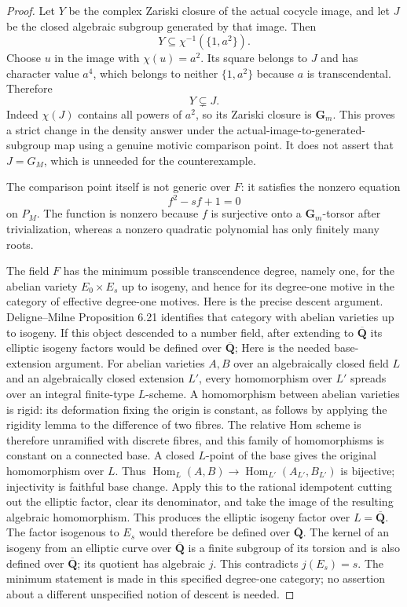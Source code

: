 \begin{proof}
Let \(Y\) be the complex Zariski closure of the actual cocycle image,
and let \(J\) be the closed algebraic subgroup generated by that image.
Then
\[
Y\subseteq\chi^{-1}(\{1,a^2\}).
\]
Choose \(u\) in the image with \(\chi(u)=a^2\). Its square belongs to
\(J\) and has character value \(a^4\), which belongs to neither
\(\{1,a^2\}\) because \(a\) is transcendental. Therefore
\[
Y\subsetneq J.
\tag{A.5.4.2}
\]
Indeed \(\chi(J)\) contains all powers of \(a^2\), so its Zariski
closure is \(\mathbf G_m\). This proves a strict change in the density
answer under the actual-image-to-generated-subgroup map using a genuine
motivic comparison point. It does not assert that \(J=G_M\), which is
unneeded for the counterexample.

The comparison point itself is not generic over \(F\): it satisfies the
nonzero equation
\[
f^2-sf+1=0
\]
on \(P_M\). The function is nonzero because \(f\) is surjective onto a
\(\mathbf G_m\)-torsor after trivialization, whereas a nonzero quadratic
polynomial has only finitely many roots.

The field \(F\) has the minimum possible transcendence degree, namely
one, for the abelian variety \(E_0\times E_s\) up to isogeny, and hence
for its degree-one motive in the category of effective degree-one
motives. Here is the precise descent argument. Deligne--Milne
Proposition 6.21 identifies that category with abelian varieties up to
isogeny. If this object descended to a number field, after extending to
\(\overline{\mathbf Q}\) its elliptic isogeny factors would be defined
over \(\overline{\mathbf Q}\); Here is the needed base-extension argument. For abelian varieties \(A,B\) over an algebraically closed field \(L\) and an algebraically closed extension \(L'\), every homomorphism over \(L'\) spreads over an integral finite-type \(L\)-scheme. A homomorphism between abelian varieties is rigid: its deformation fixing the origin is constant, as follows by applying the rigidity lemma to the difference of two fibres. The relative Hom scheme is therefore unramified with discrete fibres, and this family of homomorphisms is constant on a connected base. A closed \(L\)-point of the base gives the original homomorphism over \(L\). Thus \(\operatorname{Hom}_L(A,B)\to\operatorname{Hom}_{L'}(A_{L'},B_{L'})\) is bijective; injectivity is faithful base change. Apply this to the rational idempotent cutting out the elliptic factor, clear its denominator, and take the image of the resulting algebraic homomorphism. This produces the elliptic isogeny factor over \(L=\overline{\mathbf Q}\). The factor isogenous to \(E_s\) would therefore be
defined over \(\overline{\mathbf Q}\). The kernel of an isogeny from
an elliptic curve over \(\overline{\mathbf Q}\) is a finite subgroup of
its torsion and is also defined over \(\overline{\mathbf Q}\); its
quotient has algebraic \(j\). This contradicts \(j(E_s)=s\).
The minimum statement is made in this specified degree-one category;
no assertion about a different unspecified notion of descent is needed.


\end{proof}
